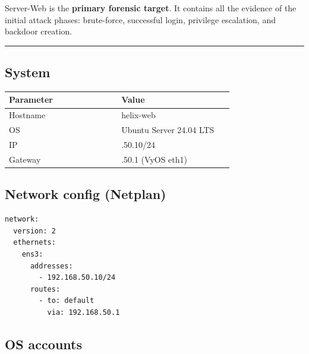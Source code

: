 Server-Web is the \textbf{primary forensic target}. It contains all the evidence of the initial attack phases: brute-force, successful login, privilege escalation, and backdoor creation.

\begin{center}\rule{0.5\linewidth}{0.5pt}\end{center}

\subsection{System}

{\footnotesize\begin{longtable}[]{@{}>{\raggedright\arraybackslash}p{0.45\linewidth}
  >{\raggedright\arraybackslash}p{0.45\linewidth}@{}}
\toprule\noalign{}
Parameter & Value \\
\midrule\noalign{}
\endhead
\bottomrule\noalign{}
\endlastfoot
Hostname & helix-web \\
OS & Ubuntu Server 24.04 LTS \\
IP & 192.168.50.10/24 \\
Gateway & 192.168.50.1 (VyOS eth1) \\
\end{longtable}}

\subsection{Network config (Netplan)}

\begin{lstlisting}
network:
  version: 2
  ethernets:
    ens3:
      addresses:
        - 192.168.50.10/24
      routes:
        - to: default
          via: 192.168.50.1
\end{lstlisting}

\subsection{OS accounts}

